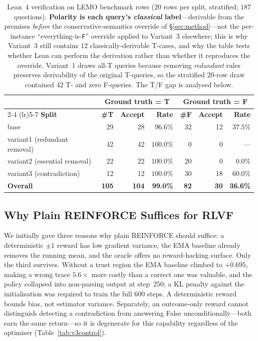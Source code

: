 \documentclass{article}
\begin{document}
\begin{table}[h]
\centering
\small
\caption{Lean~4 verification on LEMO benchmark rows ($20$ rows per split, stratified; $187$ questions). \textbf{Polarity is each query's \emph{classical} label}---derivable from the premises \emph{before} the conservative-semantics override of \S\ref{sec:method}---not the per-instance ``everything-is-\texttt{F}'' override applied to Variant~3 elsewhere; this is why Variant~3 still contains $12$ classically-derivable T-cases, and why the table tests whether Lean can perform the derivation rather than whether it reproduces the override. Variant~1 draws all-T queries because removing \emph{redundant} rules preserves derivability of the original T-queries, so the stratified $20$-row draw contained $42$ T- and zero F-queries. The T/F gap is analysed below.}
\label{tab:lean_bench}
\begin{tabular}{lrrrrrr}
\toprule
& \multicolumn{3}{c}{\textbf{Ground truth = T}} & \multicolumn{3}{c}{\textbf{Ground truth = F}} \\
\cmidrule(lr){2-4} \cmidrule(lr){5-7}
\textbf{Split} & \textbf{\#T} & \textbf{Accept} & \textbf{Rate} & \textbf{\#F} & \textbf{Accept} & \textbf{Rate} \\
\midrule
base                         & 29  & 28  & $96.6\%$ & 32  & 12 & $37.5\%$ \\
variant1 (redundant removal) & 42  & 42  & $100.0\%$ & 0   & 0  & --- \\
variant2 (essential removal) & 22  & 22  & $100.0\%$ & 20  & 0  & $0.0\%$ \\
variant3 (contradiction)     & 12  & 12  & $100.0\%$ & 30  & 18 & $60.0\%$ \\
\midrule
\textbf{Overall}             & \textbf{105} & \textbf{104} & \textbf{99.0\%} & \textbf{82} & \textbf{30} & \textbf{36.6\%} \\
\bottomrule
\end{tabular}
\end{table}


\subsection{Why Plain REINFORCE Suffices for \textsc{RLVF}}
\label{app:reinforce}
\label{app:rlvf-rationale}

We initially gave three reasons why plain REINFORCE should suffice: a
deterministic $\pm1$ reward has low gradient variance, the EMA baseline already
removes the running mean, and the oracle offers no reward-hacking surface.
Only the third survives. Without a trust region the EMA baseline climbed to
$+0.695$, making a wrong trace $5.6\times$ more costly than a correct one was
valuable, and the policy collapsed into non-parsing output at step~$250$; a KL
penalty against the initialisation was required to train the full $600$ steps.
A deterministic reward bounds bias, not estimator variance. Separately, an
outcome-only reward cannot distinguish detecting a contradiction from answering
False unconditionally---both earn the same return---so it is degenerate for
this capability regardless of the optimiser (Table~\ref{tab:v3control}).
\end{document}
